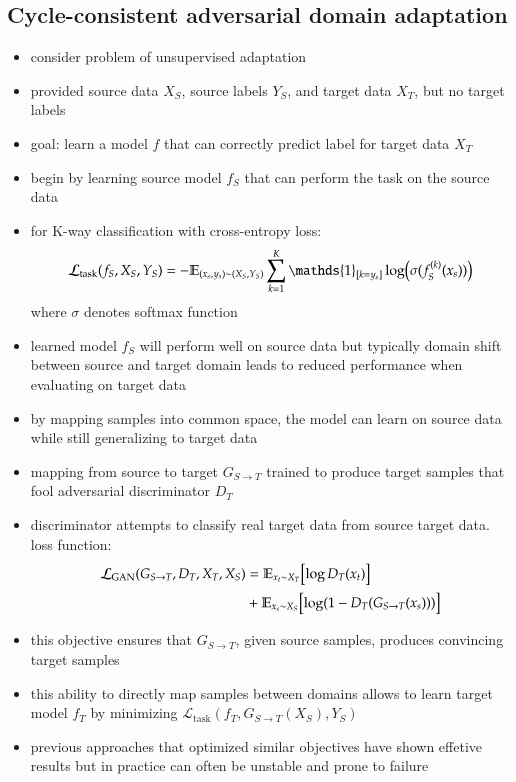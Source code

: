 \subsection{Cycle-consistent adversarial domain adaptation}
\begin{itemize}
	\item consider problem of unsupervised adaptation
	\item provided source data $X_S$, source labels $Y_S$, and target data $X_T$, but no target labels
	\item goal: learn a model $f$ that can correctly predict label for target data $X_T$
	\item begin by learning source model $f_S$ that can perform the task on the source data
	\item for K-way classification with cross-entropy loss:
	\begin{align}
	\mathcal{L}_{\text{task}}(f_S, X_S, Y_S) = -\mathbb{E}_{(x_s, y_s)\sim(X_S, Y_S)}\sum_{k=1}^{K}\mathds{1}_{[k=y_s]}\log\Bigl(\sigma(f_S^{(k)}(x_s))\Bigr)
	\end{align}
	where $\sigma$ denotes softmax function
	\item learned model $f_S$ will perform well on source data but typically domain shift between source and target domain leads to reduced performance when evaluating on target data
	\item by mapping samples into common space, the model can learn on source data while still generalizing to target data
	\item mapping from source to target $G_{S\rightarrow T}$ trained to produce target samples that fool adversarial discriminator $D_T$
	\item discriminator attempts to classify real target data from source target data. loss function:
	\begin{align}
		\mathcal{L}_{\text{GAN}}(G_{S\rightarrow T}, D_T, X_T, X_S) &= \mathbb{E}_{x_t \sim X_T}\Bigl[\log D_T(x_t)\Bigr] \\
		&+ \mathbb{E}_{x_s \sim X_S} \Bigl[\log(1-D_T(G_{S\rightarrow T}(x_s)))\Bigr]
	\end{align}
	\item this objective ensures that $G_{S\rightarrow T}$, given source samples, produces convincing target samples
	\item this ability to directly map samples between domains allows to learn target model $f_T$ by minimizing $\mathcal{L}_{\text{task}}(f_T, G_{S\rightarrow T}(X_S), Y_S)$
	\item previous approaches that optimized similar objectives have shown effetive results but in practice can often be unstable and prone to failure

\end{itemize}
